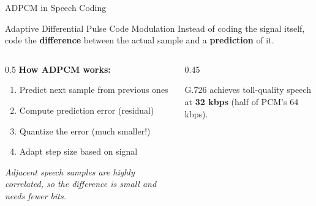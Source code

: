 \documentclass[aspectratio=169,12pt]{beamer}
\begin{document}
\begin{frame}{ADPCM in Speech Coding}
    \begin{block}{Adaptive Differential Pulse Code Modulation}
        Instead of coding the signal itself, code the \textbf{difference} between the actual sample and a \textbf{prediction} of it.
    \end{block}
    
    \vspace{0.3cm}
    \begin{columns}
        \begin{column}{0.5\textwidth}
            \textbf{How ADPCM works:}
            \begin{enumerate}
                \item Predict next sample from previous ones
                \item Compute prediction error (residual)
                \item Quantize the error (much smaller!)
                \item Adapt step size based on signal
            \end{enumerate}
            
            \vspace{0.2cm}
            \textit{Adjacent speech samples are highly correlated, so the difference is small and needs fewer bits.}
        \end{column}
        \begin{column}{0.45\textwidth}
            \begin{center}
            \end{center}
            
            G.726 achieves toll-quality speech at \textbf{32 kbps} (half of PCM's 64 kbps).
        \end{column}
    \end{columns}
\end{frame}
\end{document}
